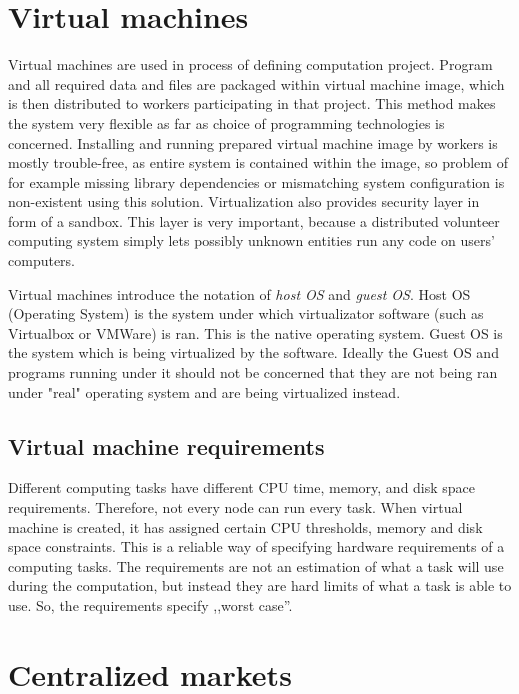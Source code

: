 \section{Virtual machines}
\label{sec:vms}

Virtual machines are used in process of defining computation project. Program and all required data and files are packaged within virtual machine image, which is then distributed to workers participating in that project. This method makes the system very flexible as far as choice of programming technologies is concerned. Installing and running prepared virtual machine image by workers is mostly trouble-free, as entire system is contained within the image, so problem of for example missing library dependencies or mismatching system configuration is non-existent using this solution. Virtualization also provides security layer in form of a sandbox. This layer is very important, because a distributed volunteer computing system simply lets possibly unknown entities run any code on users' computers.

Virtual machines introduce the notation of \emph{host OS} and \emph{guest OS}. Host OS (Operating System) is the system under which virtualizator software (such as Virtualbox or VMWare) is ran. This is the native operating system. Guest OS is the system which is being virtualized by the software. Ideally the Guest OS and programs running under it should not be concerned that they are not being ran under "real" operating system and are being virtualized instead.

\subsection{Virtual machine requirements}

Different computing tasks have different CPU time, memory, and disk space requirements. Therefore, not every node can run every task. When virtual machine is created, it has assigned certain CPU thresholds, memory and disk space constraints. This is a reliable way of specifying hardware requirements of a computing tasks. The requirements are not an estimation of what a task will use during the computation, but instead they are hard limits of what a task is able to use. So, the requirements specify ,,worst case''.

\section{Centralized markets}


